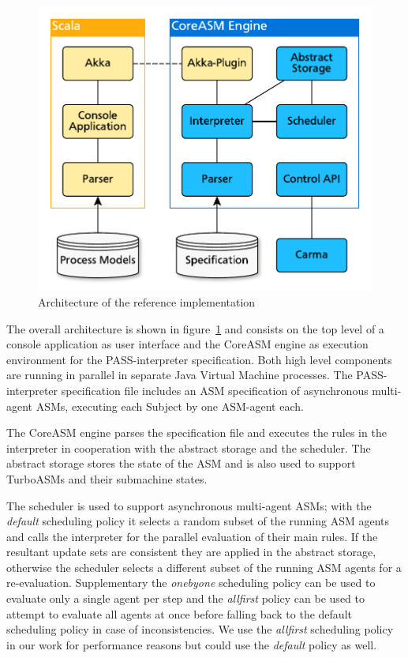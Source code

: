 \begin{figure}[htbp]
  \centering
  \includegraphics[width=0.7\linewidth]{Figures/CoreASM/ArchitekturKonsoleCoreASM}
  \caption{Architecture of the reference implementation}
  \label{fig:coreasm_architecture}
\end{figure}


The overall architecture is shown in figure~\ref{fig:coreasm_architecture} and consists on the top level of
a console application as user interface and the CoreASM engine as execution environment for the PASS-interpreter specification.
Both high level components are running in parallel in separate Java Virtual Machine processes.
The PASS-interpreter specification file includes an ASM specification of asynchronous multi-agent ASMs, executing each Subject by one ASM-agent each.


The CoreASM engine parses the specification file and executes the rules in the interpreter
in cooperation with the abstract storage and the scheduler.
The abstract storage stores the state of the ASM and is also used to support
TurboASMs and their submachine states.

The scheduler is used to support asynchronous multi-agent ASMs; with
the \textit{default} scheduling policy it selects
a random subset of the running ASM agents and calls the
interpreter for the parallel evaluation of their main rules.
If the resultant update sets
are consistent they are applied in the abstract storage, otherwise the scheduler
selects a different subset of the running ASM agents for a re-evaluation.
Supplementary the \textit{onebyone} scheduling policy can be used to evaluate
only a single agent per step and the \textit{allfirst} policy can be used
to attempt to evaluate all agents at once before falling back
to the default scheduling policy in case of inconsistencies.
We use the \textit{allfirst} scheduling policy in our work for performance reasons
but could use the \textit{default} policy as well.


